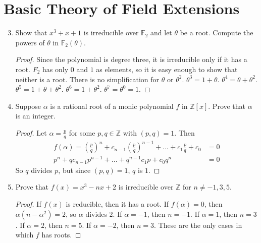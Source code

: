\documentclass{report}
\newcommand{\Z}{\mathbb{Z}}
\newcommand{\F}{\mathbb{F}}
\begin{document}
\section{Basic Theory of Field Extensions}
\begin{enumerate} 
	\setcounter{enumi}{2}
	\item  Show that $x^3+x+1$ is irreducible over $\F_2$ and let $\theta$ be a root. Compute the powers of $\theta$ in $\F_2(\theta)$.
		\begin{proof}
			Since the polynomial is degree three, it is irreducible only if it has a root. $F_2$ has only $0$ and $1$ as elements, so it is easy enough to show that neither is a root.
			There is no simplification for $\theta$ or $\theta^2$. $\theta^3=1+\theta$. $\theta^4=\theta+\theta^2$. $\theta^5=1+\theta+\theta^2$. $\theta^6=1+\theta^2$. $\theta^7=\theta^0=1$.
		\end{proof}
	\setcounter{enumi}{4}
	\item Suppose $\alpha$ is a rational root of a monic polynomial $f$ in $\Z[x]$. Prove that $\alpha$ is an integer.
		\begin{proof}
			Let $\alpha=\frac{p}{q}$ for some  $p,q\in\Z$ with $(p,q)=1$. Then
			\begin{align*}
				f(\alpha)=\left(\frac{p}{q}\right)^n+c_{n-1}\left(\frac{p}{q}\right)^{n-1}+...+c_1 \frac{p}{q}+c_0&=0\\
				p^n+qc_{n-1}p^{n-1}+...+q^{n-1}c_1p+c_0q^n&=0
			\end{align*}
			So $q$ divides $p$, but since $(p,q)=1$, $q$ is $1$.
		\end{proof}
	\setcounter{enumi}{6}
	\item Prove that $f(x)=x^3-nx+2$ is irreducible over $\Z$ for $n\neq -1,3,5$.
		\begin{proof}
			If $f(x)$ is reducible, then it has a root. If $f(\alpha)=0$, then $\alpha(n-\alpha^2)=2$, so $\alpha$ divides $2$.
			If $\alpha=-1$, then $n=-1$. If $\alpha=1$, then $n=3$. If $\alpha=2$, then $n=5$. If $\alpha=-2$, then $n=3$.
			These are the only cases in which $f$ has roots.
		\end{proof}
\end{enumerate}
\end{document}
